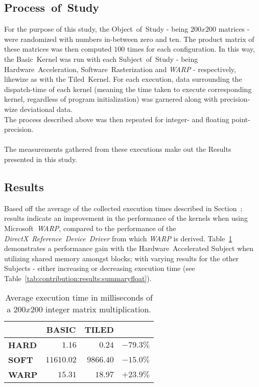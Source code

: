 \subsection{Process~of~Study}
\label{sec:contribution:processofstudy}
For the purpose of this study, the Object~of~Study - being $200x200$ matrices - were randomized with numbers in-between zero and ten.
The product matrix of these matrices was then computed $100$ times for each configuration.
In this way, the Basic~Kernel was run with each Subject~of~Study - being Hardware~Acceleration, Software~Rasterization and \textit{WARP} - respectively, likewize as with the Tiled~Kernel.
For each execution, data surrounding the dispatch-time of each kernel (meaning the time taken to execute corresponding kernel, regardless of program initialization) was garnered along with precision-wize deviational data.\\
The process described above was then repeated for integer- and floating point-precision.\\
\\
The measurements gathered from these executions make out the Results presented in this study.

\subsection{Results}
\label{sec:contribution:results}
Based off the average of the collected execution times described in Section~; results indicate an improvement in the performance of the kernels when using Microsoft~\textit{WARP}, compared to the performance of the \textit{DirectX}~\textit{Reference~Device~Driver} from which \textit{WARP} is derived.
Table~\ref{tab:contribution:results:summaryint} demonstrates a performance gain with the Hardware~Accelerated Subject when utilizing shared memory amongst blocks; with varying results for the other Subjects - either increasing or decreasing execution time (see Table~\ref{tab:contribution:results:summaryfloat}).

\begin{table}[hbt]
\begin{center}
\begin{tabular}{r|r|r|r|}
	\cline{2-3}
							& \multicolumn{1}{|c|}{\textbf{BASIC}} & \multicolumn{1}{|c|}{\textbf{TILED}}	\\ \hline
	\multicolumn{1}{|l|}{\textbf{HARD}}	& $1.16$			& $0.24$ 	& $-79.3\%$  					\\ \hline
	\multicolumn{1}{|l|}{\textbf{SOFT}}	& $11610.02$		& $9866.40$	& $-15.0\%$   					\\ \hline
	\multicolumn{1}{|l|}{\textbf{WARP}}	& $15.31$			& $18.97$	& $+23.9\%$   					\\ \hline
\end{tabular}
\end{center}
\caption{Average execution time in milliseconds of a $200x200$ integer matrix multiplication.}
\label{tab:contribution:results:summaryint}
\end{table}

